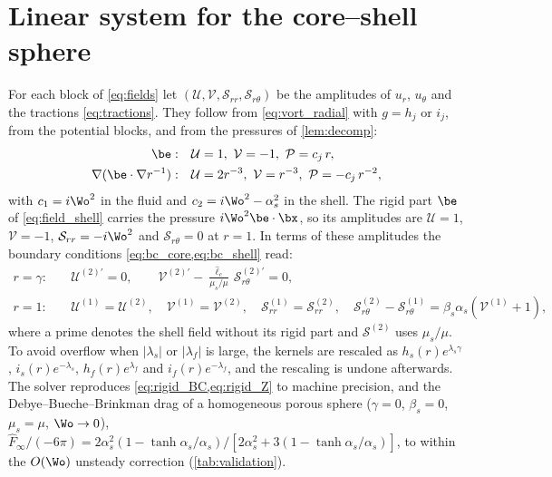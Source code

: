 \section{Linear system for the core--shell sphere}\label{app:sphere}
For each block of \cref{eq:fields} let $(\mathcal U,\mathcal V,\mathcal S_{rr},\mathcal S_{r\theta})$ be the amplitudes
of $u_r$, $u_\theta$ and the tractions \cref{eq:tractions}. They follow from \cref{eq:vort_radial} with $g=h_j$ or $i_j$,
from the potential blocks, and from the pressures of \cref{lem:decomp}:
\begin{align*}
  \be:&\quad \mathcal U=1,\ \mathcal V=-1,\ \mathcal P=c_j\,r,\\
  \nabla(\be\cdot\nabla r^{-1}):&\quad \mathcal U=2r^{-3},\ \mathcal V=r^{-3},\ \mathcal P=-c_j\,r^{-2},
\end{align*}
with $c_1=i\Wo^2$ in the fluid and $c_2=i\Wo^2-\alpha_s^2$ in the shell. The rigid part $\be$ of \cref{eq:field_shell}
carries the pressure $i\Wo^2\be\cdot\bx$, so its amplitudes are $\mathcal U=1$, $\mathcal V=-1$,
$\mathcal S_{rr}=-i\Wo^2$ and $\mathcal S_{r\theta}=0$ at $r=1$. In terms of these amplitudes the boundary conditions
\cref{eq:bc_core,eq:bc_shell} read:
\begin{align*}
  r=\gamma:&\quad \mathcal U^{(2)\prime}=0,\qquad \mathcal V^{(2)\prime}-\frac{\hat\ell_c}{\mu_s/\mu}\,\mathcal S^{(2)\prime}_{r\theta}=0,\\
  r=1:&\quad \mathcal U^{(1)}=\mathcal U^{(2)},\quad \mathcal V^{(1)}=\mathcal V^{(2)},\quad
  \mathcal S^{(1)}_{rr}=\mathcal S^{(2)}_{rr},\quad
  \mathcal S^{(2)}_{r\theta}-\mathcal S^{(1)}_{r\theta}=\beta_s\alpha_s\left(\mathcal V^{(1)}+1\right),
\end{align*}
where a prime denotes the shell field without its rigid part and $\mathcal S^{(2)}$ uses $\mu_s/\mu$. To avoid
overflow when $|\lambda_s|$ or $|\lambda_f|$ is large, the kernels are rescaled as $h_s(r)e^{\lambda_s\gamma}$,
$i_s(r)e^{-\lambda_s}$, $h_f(r)e^{\lambda_f}$ and $i_f(r)e^{-\lambda_f}$, and the rescaling is undone afterwards.
The solver reproduces \cref{eq:rigid_BC,eq:rigid_Z} to machine precision, and the Debye--Bueche--Brinkman drag of a
homogeneous porous sphere ($\gamma=0$, $\beta_s=0$, $\mu_s=\mu$, $\Wo\to0$),
$\hat F_\infty/(-6\pi)=2\alpha_s^2(1-\tanh\alpha_s/\alpha_s)/[2\alpha_s^2+3(1-\tanh\alpha_s/\alpha_s)]$, to within the
$O(\Wo)$ unsteady correction (\cref{tab:validation}).

